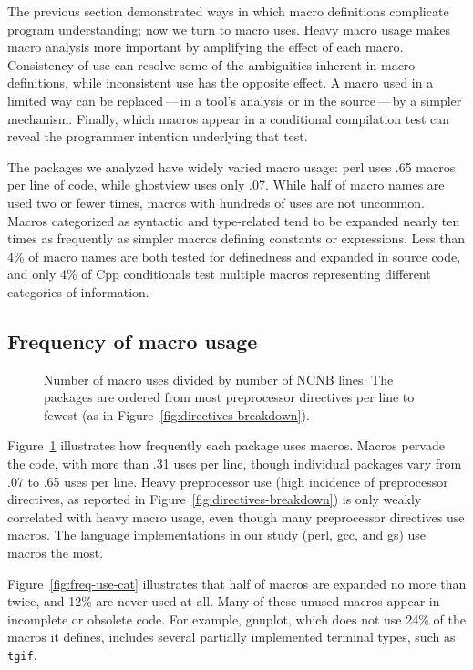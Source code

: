 \documentclass[10pt]{article}
\newcommand{\pkg}[1]{\textsf{#1}}
\newcommand{\captionsmall}[1]{\caption[]{\small #1}}
\begin{document}
The previous section demonstrated ways in which macro definitions
complicate program understanding; now we turn to macro uses.  Heavy macro
usage makes macro analysis more important by amplifying the effect of each
macro.  Consistency of use can resolve some of the ambiguities
inherent in macro definitions, while inconsistent use has the opposite
effect.  A macro used in a limited way can be replaced\,---\,in a tool's
analysis or in the source\,---\,by a simpler mechanism.  Finally, which
macros appear in a conditional compilation test can reveal the programmer
intention underlying that test.

The packages we analyzed have widely varied macro usage: \pkg{perl} uses
.65 macros per line of code, while \pkg{ghostview} uses only .07.  While
half of macro names are used two or fewer times, macros with hundreds of
uses are not uncommon.  Macros categorized as syntactic and type-related
tend to be expanded nearly ten times as frequently as simpler macros
defining constants or expressions.  Less than 4\% of macro names are both
tested for definedness and expanded in source code, and only 4\% of Cpp
conditionals test multiple macros representing different categories of
information.


\subsection{Frequency of macro usage}
\label{sec:macro-usage}

\begin{figure}
\centerline{}
\captionsmall{Number of macro uses divided by number of NCNB lines.
  The packages are ordered from most preprocessor directives per line to
  fewest (as in Figure~\ref{fig:directives-breakdown}).}
\label{fig:use-per-line}
\end{figure}

Figure~\ref{fig:use-per-line} illustrates how frequently each package uses
macros.  Macros pervade the code, with more than .31 uses per line, though
individual packages vary from .07 to .65 uses per line.  Heavy preprocessor
use (high incidence of preprocessor directives, as reported in
Figure~\ref{fig:directives-breakdown}) is only weakly correlated with
heavy macro usage, even though many preprocessor directives use macros.
The language implementations in our study (\pkg{perl}, \pkg{gcc}, and
\pkg{gs}) use macros the most.

Figure~\ref{fig:freq-use-cat}
illustrates that half of macros are expanded no more than twice, and 12\% are
never used at all.  Many of these unused macros appear in incomplete or
obsolete code.  For example, \pkg{gnuplot}, which does not use 24\% of the
macros it defines, includes several partially implemented terminal types,
such as {\tt tgif}.
\end{document}
